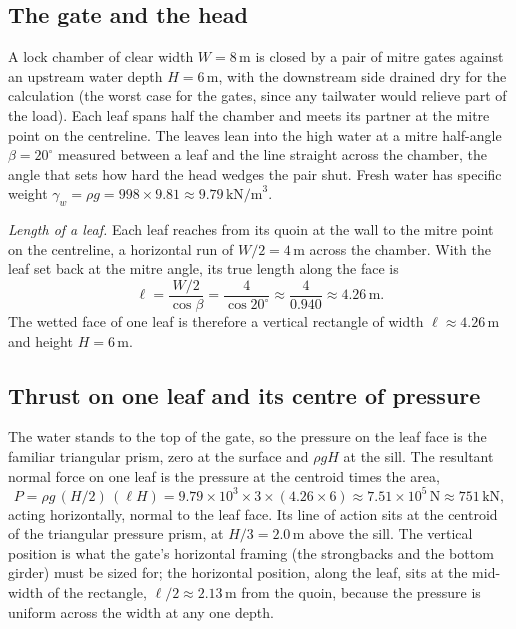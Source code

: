 

\subsection{The gate and the head}

A lock chamber of clear width $W = 8\,\si{\meter}$ is closed by a pair of
mitre gates against an upstream water depth $H = 6\,\si{\meter}$, with the
downstream side drained dry for the calculation (the worst case for the
gates, since any tailwater would relieve part of the load). Each leaf spans
half the chamber and meets its partner at the mitre point on the
centreline. The leaves lean into the high water at a mitre half-angle
$\beta = 20^{\circ}$ measured between a leaf and the line straight across
the chamber, the angle that sets how hard the head wedges the pair shut.
Fresh water has specific weight $\gamma_w = \rho g = 998 \times 9.81
\approx 9.79\,\text{kN/m}^3$.

\emph{Length of a leaf.} Each leaf reaches from its quoin at the wall to
the mitre point on the centreline, a horizontal run of $W/2 = 4\,\si{
\meter}$ across the chamber. With the leaf set back at the mitre angle, its
true length along the face is
\[
\ell = \frac{W/2}{\cos\beta} = \frac{4}{\cos 20^{\circ}}
\approx \frac{4}{0.940} \approx 4.26\,\si{\meter}.
\]
The wetted face of one leaf is therefore a vertical rectangle of width
$\ell \approx 4.26\,\si{\meter}$ and height $H = 6\,\si{\meter}$.

\subsection{Thrust on one leaf and its centre of pressure}

The water stands to the top of the gate, so the pressure on the leaf face
is the familiar triangular prism, zero at the surface and $\rho g H$ at the
sill. The resultant normal force on one leaf is the pressure at the
centroid times the area,
\[
P = \rho g\,(H/2)\,(\ell H)
= 9.79 \times 10^3 \times 3 \times (4.26 \times 6)
\approx 7.51 \times 10^5\,\text{N}
\approx 751\,\text{kN},
\]
acting horizontally, normal to the leaf face. Its line of action sits at
the centroid of the triangular pressure prism, at $H/3 = 2.0\,\si{\meter}$
above the sill. The vertical position is what the gate's horizontal framing
(the strongbacks and the bottom girder) must be sized for; the horizontal
position, along the leaf, sits at the mid-width of the rectangle, $\ell/2
\approx 2.13\,\si{\meter}$ from the quoin, because the pressure is uniform
across the width at any one depth.

